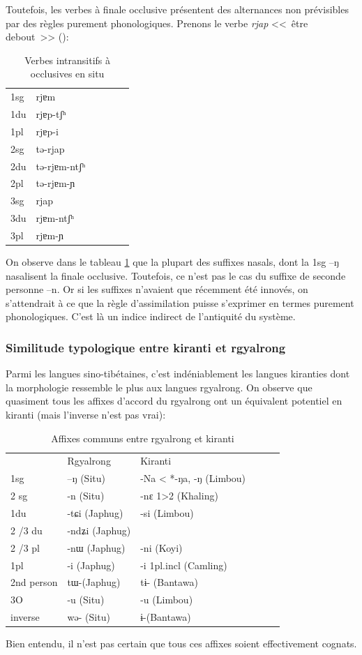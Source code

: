 \documentclass[oldfontcommands,oneside,a4paper,11pt]{memoir}
\begin{document}
Toutefois, les verbes à finale occlusive présentent des alternances non prévisibles par des règles purement phonologiques. Prenons le verbe \textit{rjap} <<~être debout~>> (\citealt[207]{linxr93jiarong}):
\begin{table}[H]
\caption{Verbes intransitifs à occlusives en situ }\label{tab:situ2}
\begin{tabular}{llllll} 
1sg &	rjɐm  \\
1du &	rjɐp-tʃʰ \\
1pl &	rjɐp-i \\
2sg &	tə-rjap \\
2du &	tə-rjɐm-ntʃʰ \\
2pl &	tə-rjɐm-ɲ \\
3sg &	rjap \\
3du &	rjɐm-ntʃʰ \\
3pl &	rjɐm-ɲ \\
\end{tabular}
\end{table}
On observe dans le tableau \ref{tab:situ2} que la plupart des suffixes nasals, dont la 1sg --ŋ nasalisent la finale occlusive. Toutefois, ce n'est pas le cas du suffixe de seconde personne --n. Or si les suffixes n'avaient que récemment été innovés, on s'attendrait à ce que la règle d'assimilation puisse s'exprimer en termes purement phonologiques. C'est là un indice indirect de l'antiquité du système.
\subsubsection{Similitude typologique entre kiranti et rgyalrong}

Parmi les langues sino-tibétaines, c'est indéniablement les langues kiranties dont la morphologie ressemble le plus aux langues rgyalrong. On observe que quasiment tous les affixes d'accord du rgyalrong ont un équivalent potentiel en kiranti (mais l'inverse n'est pas vrai):
\begin{table}[H]
\caption{Affixes communs entre rgyalrong et kiranti}\label{tab:rgyalrong.kiranti}
\begin{tabular}{llllll} 
\toprule
    &	Rgyalrong   &	Kiranti   \\	
1sg   &	–ŋ (Situ)   &	-Na < *-ŋa, -ŋ (Limbou)   \\	
2 sg   &	-n (Situ)   &	-nɛ 1>2 (Khaling)   \\	
1du   &	-tɕi (Japhug)   &	-si (Limbou)   \\	
2 /3 du   &	-ndʑi (Japhug)   &	   \\	
2 /3 pl   &	-nɯ (Japhug)   &	-ni (Koyi)   \\	
1pl   &	-i (Japhug)   &	-i 1pl.incl (Camling)   \\	
2nd person   &	tɯ-(Japhug)   &	tɨ- (Bantawa)   \\	
3O   &	-u (Situ)   &	-u (Limbou)   \\	
inverse   &	wə- (Situ)   &	ɨ-(Bantawa)   \\	
\bottomrule
\end{tabular}
\end{table}
Bien entendu, il n'est pas certain que tous ces affixes soient effectivement cognats.
\end{document}
